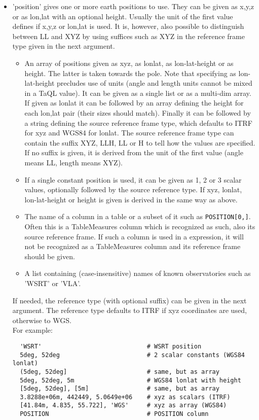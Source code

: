 \begin{itemize}
\item 'position' gives one or more earth positions to use. They can be
  given as x,y,z or as lon,lat with an optional height. Usually the
  unit of the first value defines if x,y,z or lon,lat is used. It is, however, also
  possible to distinguish between LL and XYZ by using suffices such as
  XYZ in the reference frame type given in the next argument.
  \begin{itemize}
  \item An array of positions given as xyz, as lonlat, as lon-lat-height
    or as height. The latter is taken towards the pole.
    Note that specifying as lon-lat-height precludes use of units
    (angle and length units cannot be mixed in a TaQL value).
    It can be given as a single list or as a multi-dim array.
    If given as lonlat it can be followed by an array defining
    the height for each lon,lat pair (their sizes should match).
    Finally it can be followed by a string defining the source
    reference frame type, which defaults to ITRF for xyz and WGS84
    for lonlat.
    The source reference frame type can contain the suffix XYZ, LLH, LL
    or H to tell how the values are specified. If no suffix is given,
    it is derived from the unit of the first value (angle means LL,
    length means XYZ).
  \item If a single constant position is used, it can be given as
    1, 2 or 3 scalar values, optionally followed by the source
    reference type. If xyz,  lonlat, lon-lat-height or height is given
    is derived in the same way as above.
  \item The name of a column in a table or a subset of it such as
    \texttt{POSITION[0,]}. Often this is a TableMeasures column
    which is recognized as such, also its source reference frame.
    If such a column is used in a expression, it will not be
    recognized as a TableMeasures column and its reference frame
    should be given.
  \item A list containing (case-insensitive) names of known
    observatories such as 'WSRT' or 'VLA'.
  \end{itemize}
  If needed, the reference type (with optional suffix) can be given in
  the next argument. The reference type defaults to ITRF if xyz
  coordinates are used, otherwise to WGS.
  \\For example:
\begin{verbatim}
  'WSRT'                             # WSRT position
  5deg, 52deg                        # 2 scalar constants (WGS84 lonlat)
  (5deg, 52deg]                      # same, but as array
  5deg, 52deg, 5m                    # WGS84 lonlat with height
  [5deg, 52deg], [5m]                # same, but as array
  3.8288e+06m, 442449, 5.0649e+06    # xyz as scalars (ITRF)
  [41.84m, 4.835, 55.722], 'WGS'     # xyz as array (WGS84)
  POSITION                           # POSITION column
\end{verbatim}


\end{itemize}

